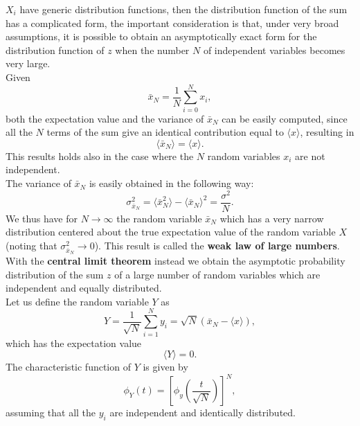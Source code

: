 $X_i$ have generic distribution functions, then the distribution function of the sum has a complicated form, the important consideration is 
that, under very broad assumptions, it is possible to obtain an asymptotically exact form for the distribution function of $z$ when the number 
$N$ of independent variables becomes very large.\\
Given
\begin{equation}
    \bar{x}_N=\frac{1}{N}\sum_{i=0}^Nx_i,
\end{equation}
both the expectation value and the variance of $\bar{x}_N$ can be easily computed, since all the $N$ terms of the sum give an identical 
contribution equal to $\langle x\rangle$, resulting in 
\begin{equation}
    \langle \bar{x}_N\rangle = \langle x \rangle.
\end{equation}
This results holds also in the case where the $N$ random variables $x_i$ are not independent.\\
The variance of $\bar{x}_N$ is easily obtained in the following way: 
\begin{equation}
    \sigma^2_{\bar{x}_N}=\langle \bar{x}^2_N\rangle -\langle \bar{x}_N\rangle^2=\frac{\sigma^2}{N}.
\end{equation}
We thus have for $N\to\infty$ the random variable $\bar{x}_N$ which has a very narrow distribution centered about the true expectation 
value of the random variable $X$ (noting that $\sigma^2_{\bar{x}_N}\to0$). This result is called the \textbf{weak law of large numbers}.\\
With the \textbf{central limit theorem} instead we obtain the asymptotic probability distribution of the sum $z$ of a large number of random 
variables which are independent and equally distributed.\\
Let us define the random variable $Y$ as
\begin{equation}
    Y=\frac{1}{\sqrt{N}}\sum_{i=1}^Ny_i=\sqrt{N}(\bar{x}_N-\langle x \rangle),
\end{equation}
which has the expectation value
\begin{equation}
    \langle Y \rangle=0.
\end{equation}
The characteristic function of $Y$ is given by
\begin{equation}
    \phi_Y(t)=\left[\phi_y\left(\frac{t}{\sqrt{N}}\right)\right]^N,
\end{equation}
assuming that all the $y_i$ are independent and identically distributed.\\
